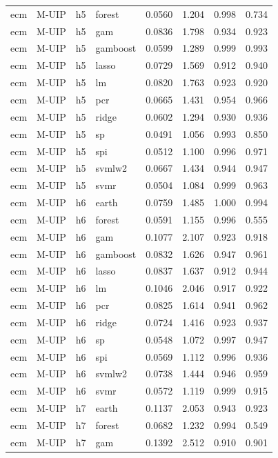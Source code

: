 \begin{ThreePartTable}
\begin{longtable}[t]{llclcccc}
ecm & M-UIP & h5 & forest & 0.0560 & 1.204 & 0.998 & 0.734\\
ecm & M-UIP & h5 & gam & 0.0836 & 1.798 & 0.934 & 0.923\\
ecm & M-UIP & h5 & gamboost & 0.0599 & 1.289 & 0.999 & 0.993\\
ecm & M-UIP & h5 & lasso & 0.0729 & 1.569 & 0.912 & 0.940\\
ecm & M-UIP & h5 & lm & 0.0820 & 1.763 & 0.923 & 0.920\\
ecm & M-UIP & h5 & pcr & 0.0665 & 1.431 & 0.954 & 0.966\\
ecm & M-UIP & h5 & ridge & 0.0602 & 1.294 & 0.930 & 0.936\\
ecm & M-UIP & h5 & sp & 0.0491 & 1.056 & 0.993 & 0.850\\
ecm & M-UIP & h5 & spi & 0.0512 & 1.100 & 0.996 & 0.971\\
ecm & M-UIP & h5 & svmlw2 & 0.0667 & 1.434 & 0.944 & 0.947\\
ecm & M-UIP & h5 & svmr & 0.0504 & 1.084 & 0.999 & 0.963\\
\addlinespace
ecm & M-UIP & h6 & earth & 0.0759 & 1.485 & 1.000 & 0.994\\
ecm & M-UIP & h6 & forest & 0.0591 & 1.155 & 0.996 & 0.555\\
ecm & M-UIP & h6 & gam & 0.1077 & 2.107 & 0.923 & 0.918\\
ecm & M-UIP & h6 & gamboost & 0.0832 & 1.626 & 0.947 & 0.961\\
ecm & M-UIP & h6 & lasso & 0.0837 & 1.637 & 0.912 & 0.944\\
ecm & M-UIP & h6 & lm & 0.1046 & 2.046 & 0.917 & 0.922\\
ecm & M-UIP & h6 & pcr & 0.0825 & 1.614 & 0.941 & 0.962\\
ecm & M-UIP & h6 & ridge & 0.0724 & 1.416 & 0.923 & 0.937\\
ecm & M-UIP & h6 & sp & 0.0548 & 1.072 & 0.997 & 0.947\\
ecm & M-UIP & h6 & spi & 0.0569 & 1.112 & 0.996 & 0.936\\
ecm & M-UIP & h6 & svmlw2 & 0.0738 & 1.444 & 0.946 & 0.959\\
ecm & M-UIP & h6 & svmr & 0.0572 & 1.119 & 0.999 & 0.915\\
\addlinespace
ecm & M-UIP & h7 & earth & 0.1137 & 2.053 & 0.943 & 0.923\\
ecm & M-UIP & h7 & forest & 0.0682 & 1.232 & 0.994 & 0.549\\
ecm & M-UIP & h7 & gam & 0.1392 & 2.512 & 0.910 & 0.901\\

\end{longtable}
\end{ThreePartTable}
